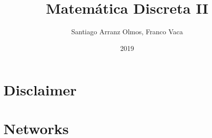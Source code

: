 \documentclass{article}
\title{Matemática Discreta II}
\author{Santiago Arranz Olmos, Franco Vaca}
\date{2019}
\theoremstyle{plain}
\theoremstyle{definition}
\begin{document}
\maketitle
\pagebreak

\section*{Disclaimer}

\pagebreak

\tableofcontents
\pagebreak

%
%
%
%
%
\pagebreak

\section{Networks}


%
%

%

%

%

%
\end{document}
